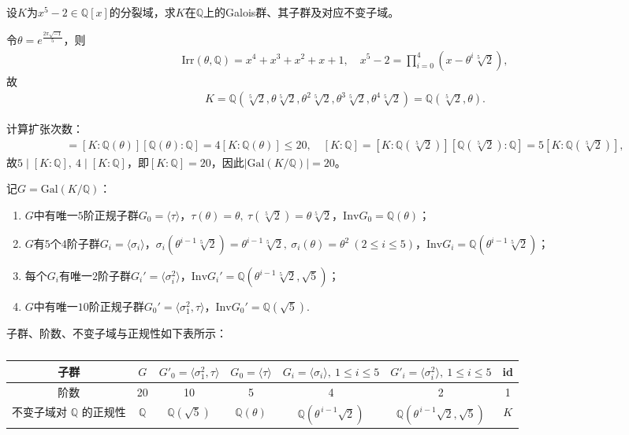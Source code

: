 \documentclass[../../main.tex]{subfiles}%
\begin{document}
\begin{example}
设$K$为$x^5-2\in\mathbb{Q}[x]$的分裂域，求$K$在$\mathbb{Q}$上的Galois群、其子群及对应不变子域。
\end{example}
\begin{solution}
令$\theta=e^{\frac{2\pi\sqrt{-1}}{5}}$，则
\begin{align*}
\mathrm{Irr}(\theta,\mathbb{Q})=x^4+x^3+x^2+x+1,\quad x^5-2=\prod\limits_{i=0}^4(x-\theta^i\sqrt[5]{2}),
\end{align*}
故
\begin{align*}
K=\mathbb{Q}(\sqrt[5]{2},\theta\sqrt[5]{2},\theta^2\sqrt[5]{2},\theta^3\sqrt[5]{2},\theta^4\sqrt[5]{2})=\mathbb{Q}(\sqrt[5]{2},\theta).
\end{align*}

计算扩张次数：
\begin{align*}
[K:\mathbb{Q}]=[K:\mathbb{Q}(\theta)][\mathbb{Q}(\theta):\mathbb{Q}]=4[K:\mathbb{Q}(\theta)]\leqslant20,\quad [K:\mathbb{Q}]=[K:\mathbb{Q}(\sqrt[5]{2})][\mathbb{Q}(\sqrt[5]{2}):\mathbb{Q}]=5[K:\mathbb{Q}(\sqrt[5]{2})],
\end{align*}
故$5\mid[K:\mathbb{Q}],\ 4\mid[K:\mathbb{Q}]$，即$[K:\mathbb{Q}]=20$，因此$|\mathrm{Gal}(K/\mathbb{Q})|=20$。

记$G=\mathrm{Gal}(K/\mathbb{Q})$：
\begin{enumerate}[(1)]
\item $G$中有唯一$5$阶正规子群$G_0=\langle\tau\rangle$，$\tau(\theta)=\theta,\ \tau(\sqrt[5]{2})=\theta\sqrt[5]{2}$，$\mathrm{Inv}G_0=\mathbb{Q}(\theta)$；
\item $G$有$5$个$4$阶子群$G_i=\langle\sigma_i\rangle$，$\sigma_i(\theta^{i-1}\sqrt[5]{2})=\theta^{i-1}\sqrt[5]{2},\ \sigma_i(\theta)=\theta^2\ (2\leqslant i\leqslant5)$，$\mathrm{Inv}G_i=\mathbb{Q}(\theta^{i-1}\sqrt[5]{2})$；
\item 每个$G_i$有唯一$2$阶子群$G_i'=\langle\sigma_i^2\rangle$，$\mathrm{Inv}G_i'=\mathbb{Q}(\theta^{i-1}\sqrt[5]{2},\sqrt{5})$；
\item $G$中有唯一$10$阶正规子群$G_0'=\langle\sigma_1^2,\tau\rangle$，$\mathrm{Inv}G_0'=\mathbb{Q}(\sqrt{5})$.
\end{enumerate}

子群、阶数、不变子域与正规性如下表所示：
\begin{table}[H]
\centering
\caption{}
\renewcommand{\arraystretch}{1.2}
\begin{tabular}{ccccccc}
\toprule
子群 & $G$ & $G'_0 = \langle \sigma_1^2, \tau \rangle$ & $G_0 = \langle \tau \rangle$ & $G_i = \langle \sigma_i \rangle,\ 1 \leqslant i \leqslant 5$ & $G'_i = \langle \sigma_i^2 \rangle,\ 1 \leqslant i \leqslant 5$ & id \\
\midrule
阶数 & 20 & 10 & 5 & 4 & 2 & 1 \\
\midrule
不变子域对 $\mathbb{Q}$ 的正规性 & $\mathbb{Q}$ & $\mathbb{Q}(\sqrt{5})$ & $\mathbb{Q}(\theta)$ & $\mathbb{Q}(\theta^{\,i-1}\sqrt{2})$ & $\mathbb{Q}(\theta^{\,i-1}\sqrt{2},\sqrt{5})$ & $K$ \\
\bottomrule
\end{tabular}
\end{table}

\end{solution}
\end{document}
